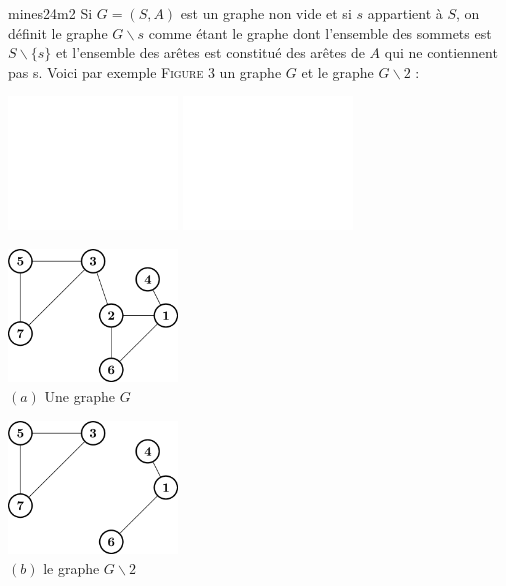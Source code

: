 \documentclass[11pt,straight,solution]{cpgedev}
\begin{document}
\begin{enonce*}{mines24m2}
Si $G=(S, A)$ est un graphe non vide et si $s$ appartient à $S$, on définit le graphe $G \backslash s$ comme étant le graphe dont l'ensemble des sommets est $S \backslash\{s\}$ et l'ensemble des arêtes est constitué des arêtes de $A$ qui ne contiennent pas s. Voici par exemple \textsc{Figure 3} un graphe $G$ et le graphe $G \backslash 2$ :

\begin{center}
    \ifdark 
        \includegraphics[width=4.5cm]{graphs/graph-dark-2}
        \endminipage
        \hfill\vrule width .4pt\hfill
        \includegraphics[width=4.5cm]{graphs/graph-dark-3}
        \endminipage
    \else 
        \begin{minipage}{.5\linewidth-1.2em}
        \centering
        \includegraphics[width=4.5cm]{graphs/graph-2}
         \\ $(a)$ Une graphe $G$
        \end{minipage}
        \hfill\vrule width .4pt\hfill
        \begin{minipage}{.5\linewidth-1.2em}
            \centering
        \includegraphics[width=4.5cm]{graphs/graph-3}
        \\ $(b)$ le graphe $G\backslash 2$
        \end{minipage}
    \fi 
\end{center}



\end{enonce*}
\end{document}
